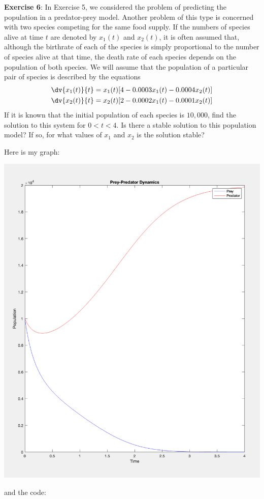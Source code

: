 \documentclass{article}
\begin{document}
\textbf{Exercise 6}: In Exercise 5, we considered the problem of predicting the population in a predator-prey model. Another problem of this type is concerned with two species competing for the same food supply. If the numbers of species alive at time $t$ are denoted by $x_{1}(t)$ and $x_{2}(t)$, it is often assumed that, although the birthrate of each of the species is simply proportional to the number of species alive at that time, the death rate of each species depends on the population of both species. We will assume that the population of a particular pair of species is described by the equations
    \begin{align*}
        \dv{x_{1}(t)}{t} &= x_{1}(t)[4 - 0.0003x_{1}(t) - 0.0004 x_{2}(t)]  \\
        \dv{x_{2}(t)}{t} &= x_{2}(t)[2 - 0.0002 x_{1}(t) - 0.0001 x_{2}(t)]   
    \end{align*}
If it is known that the initial population of each species is $10,000$, find the solution to this system for $0 < t < 4$. Is there a stable solution to this population model? If so, for what values of $x_{1}$ and $x_{2}$ is the solution stable?
    \begin{answer}
        Here is my graph:
        \begin{center}
            \includegraphics[scale=0.5]{q4}
        \end{center}
        and the code:
        \inputminted{matlab}{./code/RKsystem.m}
        \inputminted{matlab}{./code/q4f1.m}
        \inputminted{matlab}{./code/q4f2.m}
        \inputminted{matlab}{./code/script4.m}
    \end{answer}
\end{document}
